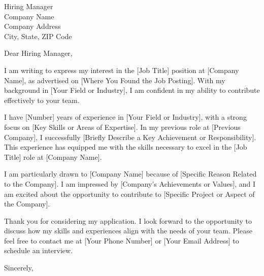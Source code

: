 \documentclass[a4paper,10pt]{letter}
\begin{document}
\begin{letter}{Hiring Manager \\ Company Name \\ Company Address \\ City, State, ZIP Code}

\opening{Dear Hiring Manager,}

I am writing to express my interest in the [Job Title] position at [Company Name], as advertised on [Where You Found the Job Posting]. With my background in [Your Field or Industry], I am confident in my ability to contribute effectively to your team.

I have [Number] years of experience in [Your Field or Industry], with a strong focus on [Key Skills or Areas of Expertise]. In my previous role at [Previous Company], I successfully [Briefly Describe a Key Achievement or Responsibility]. This experience has equipped me with the skills necessary to excel in the [Job Title] role at [Company Name].

I am particularly drawn to [Company Name] because of [Specific Reason Related to the Company]. I am impressed by [Company's Achievements or Values], and I am excited about the opportunity to contribute to [Specific Project or Aspect of the Company].

Thank you for considering my application. I look forward to the opportunity to discuss how my skills and experiences align with the needs of your team. Please feel free to contact me at [Your Phone Number] or [Your Email Address] to schedule an interview.

\closing{Sincerely,}

\signature{Your Name}
\end{letter}
\end{document}
